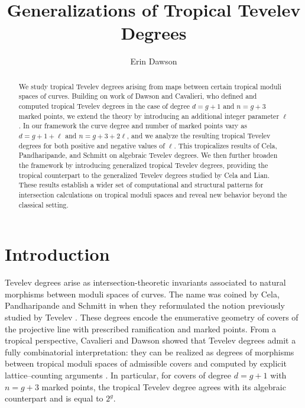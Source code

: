 \documentclass[11pt,reqno]{amsart}
\title{Generalizations of Tropical Tevelev Degrees}
\author{Erin Dawson}
\theoremstyle{definition}
\begin{document}
\maketitle
\begin{abstract}
  We study tropical Tevelev degrees arising from maps between certain tropical moduli spaces of curves. Building on work of Dawson and Cavalieri, who defined and computed tropical Tevelev degrees in the case of degree $d = g+1$ and $n = g+3$ marked points, we extend the theory by introducing an additional integer parameter $\ell$. In our framework the curve degree and number of marked points vary as $d = g + 1 + \ell$ and $n = g + 3 + 2\ell$, and we analyze the resulting tropical Tevelev degrees for both positive and negative values of $\ell$. This tropicalizes results of Cela, Pandharipande, and Schmitt on algebraic Tevelev degrees. 
  We then further broaden the framework by introducing generalized tropical Tevelev degrees, providing the tropical counterpart to the generalized Tevelev degrees studied by Cela and Lian. These results establish a wider set of computational and structural patterns for intersection calculations on tropical moduli spaces and reveal new behavior beyond the classical setting.
\end{abstract}
\section{Introduction}

Tevelev degrees arise as intersection-theoretic invariants associated to natural morphisms between moduli spaces of curves. The name was coined by Cela, Pandharipande and Schmitt in \cite{CPS:Tevdeg} when they reformulated the notion previously studied by Tevelev \cite{Tevelev:2020zux}.
These degrees encode the enumerative geometry of covers of the projective line with prescribed ramification and marked points. From a tropical perspective, Cavalieri and Dawson showed that Tevelev degrees admit a fully combinatorial interpretation: they can be realized as degrees of morphisms between tropical moduli spaces of admissible covers and computed by explicit lattice–counting arguments \cite{troptev}. In particular, for covers of degree $d=g+1$ with $n=g+3$ marked points, the tropical Tevelev degree agrees with its algebraic counterpart and is equal to $2^g$.
\end{document}
